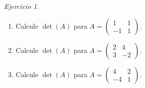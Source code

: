 \documentclass[12pt]{article}
\theoremstyle{remark}
\newtheorem{Ejer}[definicion]{Ejercicio}
\begin{document}
\begin{Ejer}
\begin{enumerate}[resume=banco]
\item Calcule $\det(A)$ para $A=\begin{pmatrix}1&1\\-1&1\end{pmatrix}$.

\item Calcule $\det(A)$ para $A=\begin{pmatrix}2&4\\3&-2\end{pmatrix}$.

\item Calcule $\det(A)$ para $A=\begin{pmatrix}4&2\\-4&1\end{pmatrix}$.

\end{enumerate}
\end{Ejer}
\end{document}
